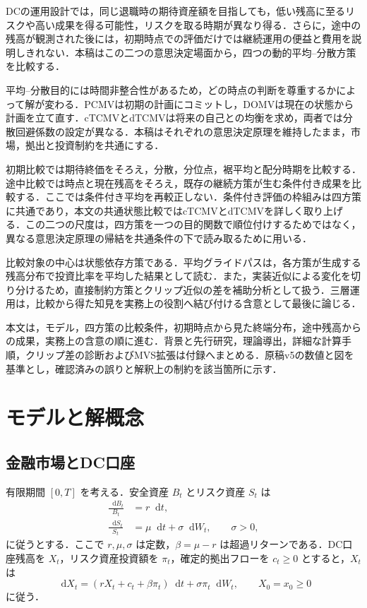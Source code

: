 \documentclass[10pt,a4paper]{article}
\theoremstyle{plain}
\theoremstyle{definition}
\newcommand{\dd}{\mathop{}\!\mathrm{d}}
\begin{document}
DCの運用設計では，同じ退職時の期待資産額を目指しても，低い残高に至るリスクや高い成果を得る可能性，リスクを取る時期が異なり得る．さらに，途中の残高が観測された後には，初期時点での評価だけでは継続運用の便益と費用を説明しきれない．本稿はこの二つの意思決定場面から，四つの動的平均--分散方策を比較する．

平均--分散目的には時間非整合性があるため，どの時点の判断を尊重するかによって解が変わる．PCMVは初期の計画にコミットし，DOMVは現在の状態から計画を立て直す．cTCMVとdTCMVは将来の自己との均衡を求め，両者では分散回避係数の設定が異なる．本稿はそれぞれの意思決定原理を維持したまま，市場，拠出と投資制約を共通にする．

初期比較では期待終価をそろえ，分散，分位点，裾平均と配分時期を比較する．途中比較では時点と現在残高をそろえ，既存の継続方策が生む条件付き成果を比較する．ここでは条件付き平均を再較正しない．条件付き評価の枠組みは四方策に共通であり，本文の共通状態比較ではcTCMVとdTCMVを詳しく取り上げる．この二つの尺度は，四方策を一つの目的関数で順位付けするためではなく，異なる意思決定原理の帰結を共通条件の下で読み取るために用いる．

比較対象の中心は状態依存方策である．平均グライドパスは，各方策が生成する残高分布で投資比率を平均した結果として読む．また，実装近似による変化を切り分けるため，直接制約方策とクリップ近似の差を補助分析として扱う．三層運用は，比較から得た知見を実務上の役割へ結び付ける含意として最後に論じる．

本文は，モデル，四方策の比較条件，初期時点から見た終端分布，途中残高からの成果，実務上の含意の順に進む．背景と先行研究，理論導出，詳細な計算手順，クリップ差の診断およびMVS拡張は付録へまとめる．原稿v5の数値と図を基準とし，確認済みの誤りと解釈上の制約を該当箇所に示す．
\section{モデルと解概念}
\label{sec:model}

\subsection{金融市場とDC口座}

有限期間 $[0,T]$ を考える．安全資産 $B_t$ とリスク資産 $S_t$ は
\begin{align}
  \frac{\dd B_t}{B_t}&=r\dd t,\label{eq:riskless}\\
  \frac{\dd S_t}{S_t}&=\mu\dd t+\sigma\dd W_t,\qquad \sigma>0,\label{eq:risky}
\end{align}
に従うとする．ここで $r,\mu,\sigma$ は定数，$\beta=\mu-r$ は超過リターンである．DC口座残高を $X_t$，リスク資産投資額を $\pi_t$，確定的拠出フローを $c_t\geq0$ とすると，$X_t$ は
\begin{equation}
  \dd X_t=(rX_t+c_t+\beta\pi_t)\dd t+\sigma\pi_t\dd W_t,
  \qquad X_0=x_0\geq0
  \label{eq:X-dynamics}
\end{equation}
に従う．
\end{document}

